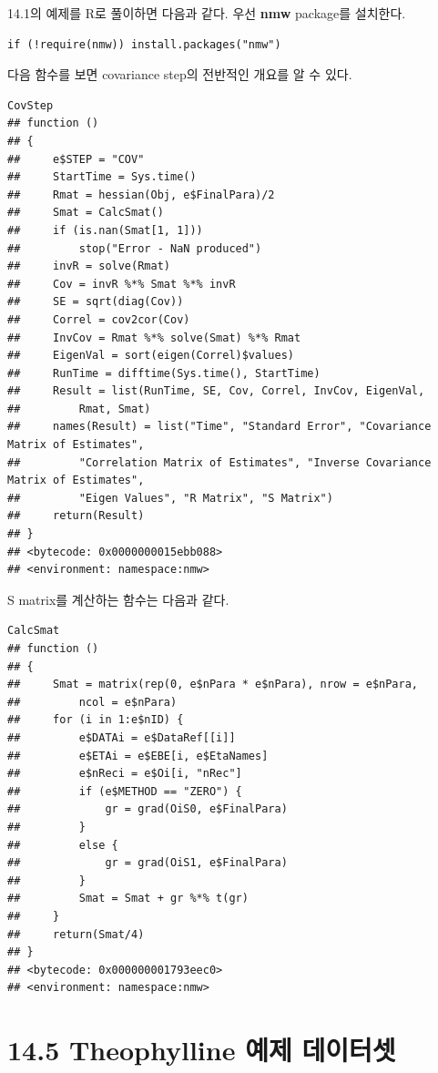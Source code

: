 \documentclass[
  10pt,
]{krantz}
\begin{document}
14.1의 예제를 R로 풀이하면 다음과 같다. 우선 \textbf{nmw} package를 설치한다.

\begin{verbatim}
if (!require(nmw)) install.packages("nmw")
\end{verbatim}

다음 함수를 보면 covariance step의 전반적인 개요를 알 수 있다.

\begin{verbatim}
CovStep
## function () 
## {
##     e$STEP = "COV"
##     StartTime = Sys.time()
##     Rmat = hessian(Obj, e$FinalPara)/2
##     Smat = CalcSmat()
##     if (is.nan(Smat[1, 1])) 
##         stop("Error - NaN produced")
##     invR = solve(Rmat)
##     Cov = invR %*% Smat %*% invR
##     SE = sqrt(diag(Cov))
##     Correl = cov2cor(Cov)
##     InvCov = Rmat %*% solve(Smat) %*% Rmat
##     EigenVal = sort(eigen(Correl)$values)
##     RunTime = difftime(Sys.time(), StartTime)
##     Result = list(RunTime, SE, Cov, Correl, InvCov, EigenVal, 
##         Rmat, Smat)
##     names(Result) = list("Time", "Standard Error", "Covariance Matrix of Estimates", 
##         "Correlation Matrix of Estimates", "Inverse Covariance Matrix of Estimates", 
##         "Eigen Values", "R Matrix", "S Matrix")
##     return(Result)
## }
## <bytecode: 0x0000000015ebb088>
## <environment: namespace:nmw>
\end{verbatim}

S matrix를 계산하는 함수는 다음과 같다.

\begin{verbatim}
CalcSmat
## function () 
## {
##     Smat = matrix(rep(0, e$nPara * e$nPara), nrow = e$nPara, 
##         ncol = e$nPara)
##     for (i in 1:e$nID) {
##         e$DATAi = e$DataRef[[i]]
##         e$ETAi = e$EBE[i, e$EtaNames]
##         e$nReci = e$Oi[i, "nRec"]
##         if (e$METHOD == "ZERO") {
##             gr = grad(OiS0, e$FinalPara)
##         }
##         else {
##             gr = grad(OiS1, e$FinalPara)
##         }
##         Smat = Smat + gr %*% t(gr)
##     }
##     return(Smat/4)
## }
## <bytecode: 0x000000001793eec0>
## <environment: namespace:nmw>
\end{verbatim}

\hypertarget{theophylline-uxc608uxc81c-uxb370uxc774uxd130uxc14b}{%
\section{14.5 Theophylline 예제 데이터셋}\label{theophylline-uxc608uxc81c-uxb370uxc774uxd130uxc14b}}
\end{document}

